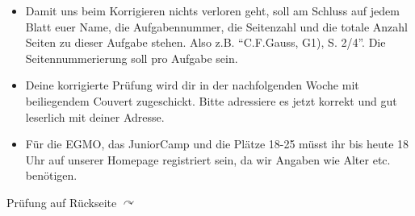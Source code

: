 \documentclass[12pt,a4paper]{article}
\begin{document}
\begin{itemize}
\item Damit uns beim Korrigieren nichts verloren geht, soll am Schluss auf jedem Blatt euer Name, die Aufgabennummer, die Seitenzahl und die totale Anzahl Seiten zu dieser Aufgabe stehen. Also z.B. "`C.F.Gauss, G1), S. 2/4"'. Die Seitennummerierung soll pro Aufgabe sein.

\item Deine korrigierte Prüfung wird dir in der nachfolgenden Woche mit beiliegendem Couvert zugeschickt. Bitte adressiere es jetzt korrekt und gut leserlich mit deiner Adresse.

\item Für die EGMO, das JuniorCamp und die Plätze 18-25 müsst ihr bis heute 18 Uhr auf unserer Homepage registriert sein, da wir Angaben wie Alter etc. benötigen.
\end{itemize}

\vfill
\hfill
Prüfung auf Rückseite $\curvearrowright$
\end{document}

